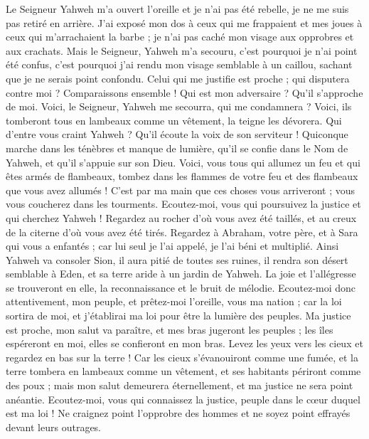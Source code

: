 \begin{multicols}{2}
Le Seigneur Yahweh m'a ouvert l'oreille et je n'ai pas été rebelle, je ne me suis pas retiré en arrière.
J'ai exposé mon dos à ceux qui me frappaient et mes joues à ceux qui m'arrachaient la barbe ; je n'ai pas caché mon visage aux opprobres et aux crachats.
Mais le Seigneur, Yahweh m'a secouru, c'est pourquoi je n'ai point été confus, c'est pourquoi j'ai rendu mon visage semblable à un caillou, sachant que je ne serais point confondu.
Celui qui me justifie est proche ; qui disputera contre moi ? Comparaissons ensemble ! Qui est mon adversaire ? Qu'il s'approche de moi.
Voici, le Seigneur, Yahweh me secourra, qui me condamnera ? Voici, ils tomberont tous en lambeaux comme un vêtement, la teigne les dévorera.
Qui d'entre vous craint Yahweh ? Qu'il écoute la voix de son serviteur ! Quiconque marche dans les ténèbres et manque de lumière, qu'il se confie dans le Nom de Yahweh, et qu'il s'appuie sur son Dieu.
Voici, vous tous qui allumez un feu et qui êtes armés de flambeaux, tombez dans les flammes de votre feu et des flambeaux que vous avez allumés ! C'est par ma main que ces choses vous arriveront ; vous vous coucherez dans les tourments.
\VerseOne{}Ecoutez-moi, vous qui poursuivez la justice et qui cherchez Yahweh ! Regardez au rocher d'où vous avez été taillés, et au creux de la citerne d'où vous avez été tirés.
Regardez à Abraham, votre père, et à Sara qui vous a enfantés ; car lui seul je l'ai appelé, je l'ai béni et multiplié.
Ainsi Yahweh va consoler Sion, il aura pitié de toutes ses ruines, il rendra son désert semblable à Eden, et sa terre aride à un jardin de Yahweh. La joie et l'allégresse se trouveront en elle, la reconnaissance et le bruit de mélodie.
Ecoutez-moi donc attentivement, mon peuple, et prêtez-moi l'oreille, vous ma nation ; car la loi sortira de moi, et j'établirai ma loi pour être la lumière des peuples.
Ma justice est proche, mon salut va paraître, et mes bras jugeront les peuples ; les îles espéreront en moi, elles se confieront en mon bras.
Levez les yeux vers les cieux et regardez en bas sur la terre ! Car les cieux s'évanouiront comme une fumée, et la terre tombera en lambeaux comme un vêtement, et ses habitants périront comme des poux ; mais mon salut demeurera éternellement, et ma justice ne sera point anéantie.
Ecoutez-moi, vous qui connaissez la justice, peuple dans le cœur duquel est ma loi ! Ne craignez point l'opprobre des hommes et ne soyez point effrayés devant leurs outrages.

\end{multicols}
